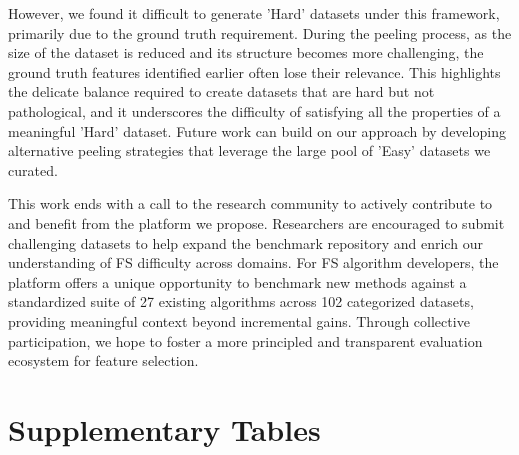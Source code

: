 \documentclass[preprint,12pt,authoryear]{elsarticle}
\begin{document}
However, we found it difficult to generate 'Hard' datasets under this framework, primarily due to the ground truth requirement. During the peeling process, as the size of the dataset is reduced and its structure becomes more challenging, the ground truth features identified earlier often lose their relevance. This highlights the delicate balance required to create datasets that are hard but not pathological, and it underscores the difficulty of satisfying all the properties of a meaningful 'Hard' dataset.  Future work can build on our approach by developing alternative peeling strategies that leverage the large pool of 'Easy' datasets we curated.

This work ends with a call to the research community to actively contribute to and benefit from the platform we propose. Researchers are encouraged to submit challenging datasets to help expand the benchmark repository and enrich our understanding of FS difficulty across domains. For FS algorithm developers, the platform offers a unique opportunity to benchmark new methods against a standardized suite of 27 existing algorithms across 102 categorized datasets, providing meaningful context beyond incremental gains. Through collective participation, we hope to foster a more principled and transparent evaluation ecosystem for feature selection.

\newpage

\appendix
\section{Supplementary Tables}
\label{app1}
\end{document}
